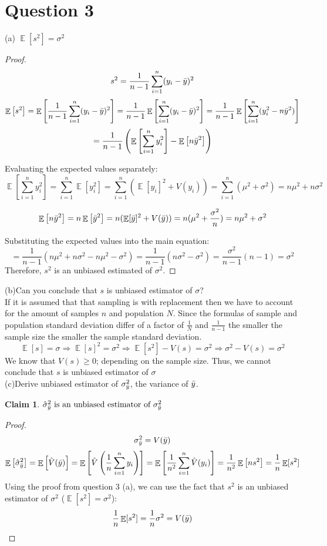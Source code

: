 \documentclass[11pt]{article}
\DeclareMathOperator*{\E}{\mathbb{E}}
\theoremstyle{claim}
\newtheorem*{claim}{Claim}
\begin{document}
\newpage
\section*{Question 3}
(a) $\E[s^2]=\sigma^2$
\begin{proof}
\[s^2=\frac{1}{n-1}\sum^n_{i=1}(y_i-\Bar{y})^2\]
\[\E\left[ s^2 \right] = \E\left[ 
\frac{1}{n-1}\sum^n_{i=1}(y_i-\Bar{y})^2
\right]=\frac{1}{n-1}\E\left[
\sum^n_{i=1}(y_i-\Bar{y})^2
\right]=
\frac{1}{n-1}\E\left[
\sum^n_{i=1}(y_i^2-n\Bar{y}^2)
\right]\]
\[=\frac{1}{n-1}\left(
\E\left[ 
\sum^n_{i=1}y_i^2
\right]-
\E\left[
n\Bar{y}^2
\right]
\right)\]

Evaluating the expected values separately: 
\[\E\left[ 
\sum^n_{i=1}y_i^2
\right]=\sum^n_{i=1}\E[y_i^2]=
\sum^n_{i=1}\left(\E[y_i]^2+V(y_i)\right)=
\sum^n_{i=1} (\mu^2 + \sigma^2)=
n\mu^2 + n\sigma^2\]

\[\E\left[
n\Bar{y}^2
\right]=n\E\left[
\Bar{y}^2
\right]=
n(\E[\Bar{y}]^2+V(\Bar{y}))=n(\mu^2+\frac{\sigma^2}{n})=n\mu^2+\sigma^2\]

Substituting the expected values into the main equation:
\[=\frac{1}{n-1}(n\mu^2 + n\sigma^2 -n\mu^2-\sigma^2 )=
\frac{1}{n-1}(n\sigma^2-\sigma^2)=
\frac{\sigma^2}{n-1}(n-1)=\sigma^2\]
Therefore, $s^2$ is an unbiased estimated of $\sigma^2$.
\end{proof}
\noindent (b)Can you conclude that $s$ is unbiased estimator of $\sigma$?\\
If it is assumed that that sampling is with replacement then we have to account for the amount of samples $n$ and population $N$. Since the formulas of sample and population standard deviation differ of a factor of $\frac{1}{N}$ and $\frac{1}{n-1}$ the smaller the sample size the smaller the sample standard deviation. 
\[\E[s]=\sigma \Rightarrow \E[s]^2=\sigma^2 \Rightarrow \E[s^2]-V(s)=\sigma^2 \Rightarrow \sigma^2 -V(s) =\sigma^2\]
We know that $V(s) \geq 0$; depending on the sample size. Thus, we cannot conclude that $s$ is unbiased estimator of $\sigma$
\vspace{5mm}
\\(c)Derive unbiased estimator of $\sigma^2_{\Bar{y}}$, the variance of $\Bar{y}$.
\begin{claim}
$\hat{\sigma}^2_{\Bar{y}} \text{ is an unbiased estimator of } \sigma^2_{\Bar{y}}$
\end{claim} 
\begin{proof}
\[\sigma^2_{\Bar{y}}=V(\Bar{y})\]
\[\E\left[\hat{\sigma}^2_{\Bar{y}}\right]=\E\left[\hat{V}(\Bar{y})\right]=\E\left[\hat{V}\left(\frac{1}{n}\sum^n_{i=1}y_i\right)\right]=\E\left[\frac{1}{n^2}\sum^n_{i=1}\hat{V}(y_i)\right]=\frac{1}{n^2}\E\left[ns^2\right]=\frac{1}{n}\E[s^2]\]
Using the proof from question 3 (a), we can use the fact that $s^2$ is an unbiased estimator of $\sigma^2$ ($\E[s^2]=\sigma^2$):
\[\frac{1}{n}\E[s^2]=\frac{1}{n}\sigma^2=V(\Bar{y})\]
\end{proof}
\end{document}
